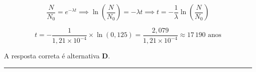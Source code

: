 \documentclass[a4paper,12pt]{article}
\newcommand{\printingbibliography}{%

    \pagestyle{myheadings}
    \markright{}
    \sloppy
    \printbibliography[heading=bibintoc, %
                   title=Refer\^encias %
                  ]
    \fussy%
}
\begin{document}
\begin{flushleft}
\vspace{0.3cm}


\[
\frac{N}{N_0} = e^{-\lambda t} \implies \ln\left(\frac{N}{N_0}\right) = -\lambda t \implies t = -\frac{1}{\lambda} \ln\left(\frac{N}{N_0}\right)
\]

\vspace{0.3cm}


\[
t = -\frac{1}{1{,}21 \times 10^{-4}} \times \ln(0{,}125) = \frac{2{,}079}{1{,}21 \times 10^{-4}} \approx 17\,190 \text{ anos}
\]

\vspace{0.3cm}


A resposta correta é alternativa \colorbox{green!50}{\textbf{D}}.
\end{flushleft}

\noindent\rule{\linewidth}{0.6pt}\\


%
%
%
%
%


\end{document}
